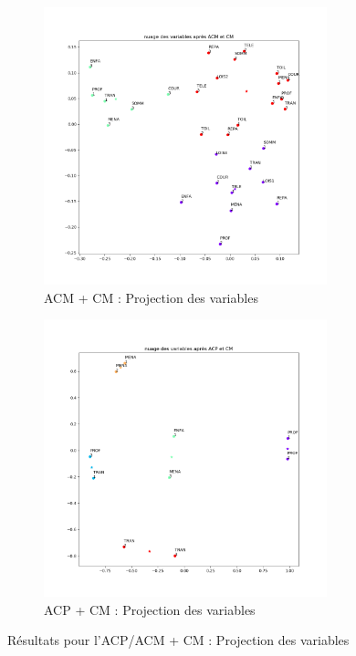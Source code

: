     \begin{figure}[!htb]
        \begin{subfigure}[b]{0.45\textwidth}
            \centering
            \includegraphics[width=0.9\textwidth]{img/Variables_ACM-CM.png}
            \caption{ACM + CM : Projection des variables}
            \label{Label_Variables_ACM-CM.png}
        \end{subfigure}
        \begin{subfigure}[b]{0.45\textwidth}
            \centering
            \includegraphics[width=0.9\textwidth]{img/Variables_ACP-CM.png}
            \caption{ACP + CM : Projection des variables}
            \label{Label_Variables_ACP-CM.png}
        \end{subfigure}
        \caption{Résultats pour l'ACP/ACM + CM : Projection des variables}
        \label{Label_Variables_ACP_ACM-CM.png}
    \end{figure}
    
